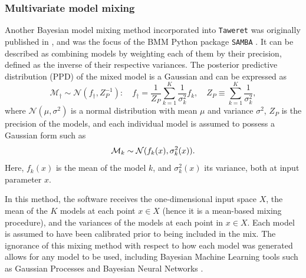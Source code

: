 \documentclass[10pt, preprint,aps,prc,floatfix,
tightenlines,
nofootinbib,superscriptaddress]{revtex4-2}
\begin{document}

\subsubsection{Multivariate model mixing} %

Another Bayesian model mixing method incorporated into \texttt{Taweret} was originally published in \cite{Semposki:2022gcp}, and was the focus of the BMM Python package \texttt{SAMBA} \cite{SAMBA}. It can be described as combining models by weighting each of them by their precision, defined as the inverse of their respective variances. The posterior predictive distribution (PPD) of the mixed model is a Gaussian and can be expressed as
\begin{equation}
    \label{eq:multi_mm_gaussian}
   \mathcal M_\dagger \sim {\mathcal N(f_\dagger, Z_P^{-1})}:
    \quad
    f_{\dagger} = \frac{1}{Z_P}\sum_{k=1}^{K} \frac{1}{\sigma^{2}_k}f_k,
    \quad Z_P \equiv \sum_{k=1}^{K}\frac{1}{\sigma^{2}_k},
\end{equation}
where $\mathcal N(\mu, \sigma^2)$ is a normal distribution with mean $\mu$ and variance $\sigma^2$, $Z_{P}$ is the precision of the models, and each individual model is assumed to possess a Gaussian form such as
\begin{equation}
    {\cal M}_{k} \sim {\cal N}(f_{k}(x),\sigma^2_{k}(x)).
\end{equation}
Here, $f_{k}(x)$ is the mean of the model $k$, and $\sigma^{2}_{k}(x)$ its variance, both at input parameter $x$.

In this method, the software receives the one-dimensional input space $X$, the mean of the $K$ models at each point $ x \in X$ (hence it is a mean-based mixing procedure), and the variances of the models at each point in $x \in X$. Each model is assumed to have been calibrated prior to being included in the mix. The ignorance of this mixing method with respect to how each model was generated allows for any model to be used, including Bayesian Machine Learning tools such as Gaussian Processes \cite{Semposki:2022gcp} and Bayesian Neural Networks \cite{Kronheim:2020dmp}.
\end{document}
